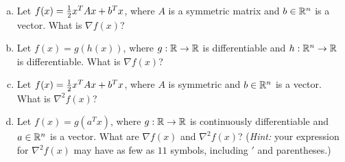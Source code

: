  \begin{enumerate}[(a)]
  \item \label{item:quadratic-gradient}
    Let $f(x) = \frac{1}{2} x^T A x + b^T x$, where $A$ is a symmetric matrix and
    $b \in \mathbb{R}^n$ is a vector. What is $\nabla f(x)$?

  \item \label{item:chain-rule}
    Let $f(x) = g(h(x))$, where $g : \mathbb{R} \to \mathbb{R}$ is
    differentiable and $h : \mathbb{R}^n \to \mathbb{R}$ is differentiable.
    What is $\nabla f(x)$?

  \item Let $f(x) = \frac{1}{2} x^T A x + b^T x$, where
    $A$ is symmetric and $b \in \mathbb{R}^n$ is a vector. What is
    $\nabla^2 f(x)$?

  \item Let $f(x) = g(a^T x)$, where $g : \mathbb{R} \to \mathbb{R}$ is continuously
    differentiable and $a \in \mathbb{R}^n$ is a vector.
    What are $\nabla f(x)$ and $\nabla^2 f(x)$?
    (\emph{Hint:} your expression for $\nabla^2 f(x)$ may have as few as
    $11$ symbols, including $'$ and parentheses.)

  \end{enumerate}
